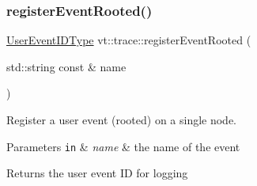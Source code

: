 \mbox{\label{namespacevt_1_1trace_ab2627c07d28361b471d0b9008de2f20c}} 
\subsubsection{\texorpdfstring{register\+Event\+Rooted()}{registerEventRooted()}\hspace{0.1cm}{\footnotesize\ttfamily [2/2]}}
{\footnotesize\ttfamily \hyperlink{namespacevt_1_1trace_a5908920d051c144c89f17c69ed262350}{User\+Event\+I\+D\+Type} vt\+::trace\+::register\+Event\+Rooted (\begin{DoxyParamCaption}\item[{std\+::string const \&}]{name }\end{DoxyParamCaption})}



Register a user event (rooted) on a single node. 


\begin{DoxyParams}[1]{Parameters}
\mbox{\tt in}  & {\em name} & the name of the event\\
\hline
\end{DoxyParams}
\begin{DoxyReturn}{Returns}
the user event ID for logging 
\end{DoxyReturn}
